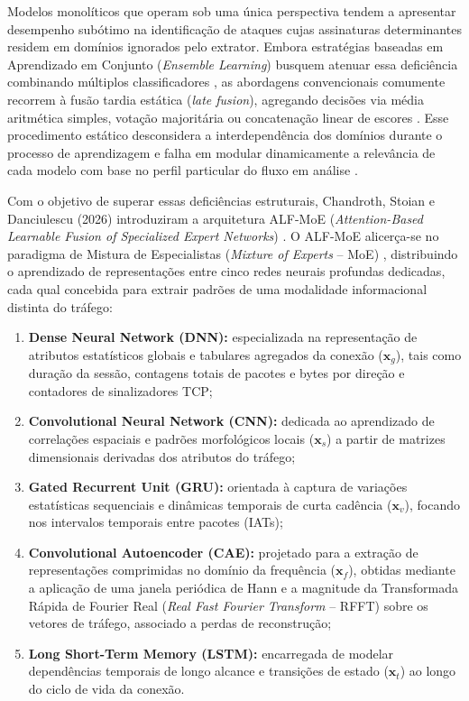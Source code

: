 Modelos monolíticos que operam sob uma única perspectiva tendem a apresentar desempenho subótimo na identificação de ataques cujas assinaturas determinantes residem em domínios ignorados pelo extrator. Embora estratégias baseadas em Aprendizado em Conjunto (\emph{Ensemble Learning}) busquem atenuar essa deficiência combinando múltiplos classificadores \cite{hsae2025, moevd2025}, as abordagens convencionais comumente recorrem à fusão tardia estática (\emph{late fusion}), agregando decisões via média aritmética simples, votação majoritária ou concatenação linear de escores \cite{alfmoe2026}. Esse procedimento estático desconsidera a interdependência dos domínios durante o processo de aprendizagem e falha em modular dinamicamente a relevância de cada modelo com base no perfil particular do fluxo em análise \cite{trafficmoe2026}.

Com o objetivo de superar essas deficiências estruturais, Chandroth, Stoian e Danciulescu (2026) introduziram a arquitetura ALF-MoE (\emph{Attention-Based Learnable Fusion of Specialized Expert Networks}) \cite{alfmoe2026}. O ALF-MoE alicerça-se no paradigma de Mistura de Especialistas (\emph{Mixture of Experts} -- MoE) \cite{jacobs1991adaptive, shazeer2017outrageously}, distribuindo o aprendizado de representações entre cinco redes neurais profundas dedicadas, cada qual concebida para extrair padrões de uma modalidade informacional distinta do tráfego:
\begin{enumerate}
    \item \textbf{Dense Neural Network (DNN):} especializada na representação de atributos estatísticos globais e tabulares agregados da conexão ($\mathbf{x}_g$), tais como duração da sessão, contagens totais de pacotes e bytes por direção e contadores de sinalizadores TCP;
    \item \textbf{Convolutional Neural Network (CNN):} dedicada ao aprendizado de correlações espaciais e padrões morfológicos locais ($\mathbf{x}_s$) a partir de matrizes dimensionais derivadas dos atributos do tráfego;
    \item \textbf{Gated Recurrent Unit (GRU):} orientada à captura de variações estatísticas sequenciais e dinâmicas temporais de curta cadência ($\mathbf{x}_v$), focando nos intervalos temporais entre pacotes (IATs);
    \item \textbf{Convolutional Autoencoder (CAE):} projetado para a extração de representações comprimidas no domínio da frequência ($\mathbf{x}_f$), obtidas mediante a aplicação de uma janela periódica de Hann e a magnitude da Transformada Rápida de Fourier Real (\emph{Real Fast Fourier Transform} -- RFFT) sobre os vetores de tráfego, associado a perdas de reconstrução;
    \item \textbf{Long Short-Term Memory (LSTM):} encarregada de modelar dependências temporais de longo alcance e transições de estado ($\mathbf{x}_t$) ao longo do ciclo de vida da conexão.
\end{enumerate}

